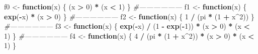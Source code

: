 \documentclass[]{book}
\newenvironment{Shaded}{\begin{snugshade}}{\end{snugshade}}
\newcommand{\CommentTok}[1]{\textcolor[rgb]{0.56,0.35,0.01}{\textit{#1}}}
\newcommand{\ControlFlowTok}[1]{\textcolor[rgb]{0.13,0.29,0.53}{\textbf{#1}}}
\newcommand{\DecValTok}[1]{\textcolor[rgb]{0.00,0.00,0.81}{#1}}
\newcommand{\KeywordTok}[1]{\textcolor[rgb]{0.13,0.29,0.53}{\textbf{#1}}}
\newcommand{\NormalTok}[1]{#1}
\newcommand{\OperatorTok}[1]{\textcolor[rgb]{0.81,0.36,0.00}{\textbf{#1}}}
\newcommand{\StringTok}[1]{\textcolor[rgb]{0.31,0.60,0.02}{#1}}
\theoremstyle{definition}
\theoremstyle{definition}
\theoremstyle{definition}
\theoremstyle{remark}
\begin{document}
\begin{Shaded}
\begin{Highlighting}[]
\NormalTok{f0 <-}\StringTok{ }\ControlFlowTok{function}\NormalTok{(x) \{}
\NormalTok{  (x }\OperatorTok{>}\StringTok{ }\DecValTok{0}\NormalTok{) }\OperatorTok{*}\StringTok{ }\NormalTok{(x }\OperatorTok{<}\StringTok{ }\DecValTok{1}\NormalTok{)}
\NormalTok{\}}
\CommentTok{#------------------}
\NormalTok{f1 <-}\StringTok{ }\ControlFlowTok{function}\NormalTok{(x) \{}
  \KeywordTok{exp}\NormalTok{(}\OperatorTok{-}\NormalTok{x) }\OperatorTok{*}\StringTok{ }\NormalTok{(x }\OperatorTok{>}\StringTok{ }\DecValTok{0}\NormalTok{)}
\NormalTok{\}}
\CommentTok{#------------------}
\NormalTok{f2 <-}\StringTok{ }\ControlFlowTok{function}\NormalTok{(x) \{}
  \DecValTok{1} \OperatorTok{/}\StringTok{ }\NormalTok{(pi }\OperatorTok{*}\StringTok{ }\NormalTok{(}\DecValTok{1} \OperatorTok{+}\StringTok{ }\NormalTok{x}\OperatorTok{^}\DecValTok{2}\NormalTok{))}
\NormalTok{\}}
\CommentTok{#------------------}
\NormalTok{f3 <-}\StringTok{ }\ControlFlowTok{function}\NormalTok{(x) \{}
  \KeywordTok{exp}\NormalTok{(}\OperatorTok{-}\NormalTok{x) }\OperatorTok{/}\StringTok{ }\NormalTok{(}\DecValTok{1} \OperatorTok{-}\StringTok{ }\KeywordTok{exp}\NormalTok{(}\OperatorTok{-}\DecValTok{1}\NormalTok{)) }\OperatorTok{*}\StringTok{ }\NormalTok{(x }\OperatorTok{>}\StringTok{ }\DecValTok{0}\NormalTok{) }\OperatorTok{*}\StringTok{ }\NormalTok{(x }\OperatorTok{<}\StringTok{ }\DecValTok{1}\NormalTok{)}
\NormalTok{\}}
\CommentTok{#------------------}
\NormalTok{f4 <-}\StringTok{ }\ControlFlowTok{function}\NormalTok{(x) \{}
  \DecValTok{4} \OperatorTok{/}\StringTok{ }\NormalTok{(pi }\OperatorTok{*}\StringTok{ }\NormalTok{(}\DecValTok{1} \OperatorTok{+}\StringTok{ }\NormalTok{x}\OperatorTok{^}\DecValTok{2}\NormalTok{)) }\OperatorTok{*}\StringTok{ }\NormalTok{(x }\OperatorTok{>}\StringTok{ }\DecValTok{0}\NormalTok{) }\OperatorTok{*}\StringTok{ }\NormalTok{(x }\OperatorTok{<}\StringTok{ }\DecValTok{1}\NormalTok{)}
\NormalTok{\}}
\end{Highlighting}
\end{Shaded}
\end{document}
